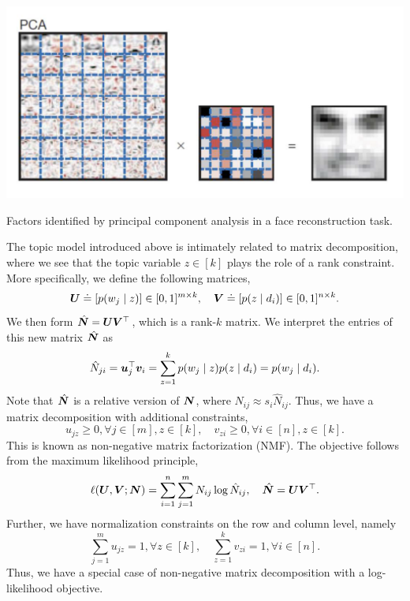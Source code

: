 \begin{marginfigure}
    \centering
    \includegraphics[width=\textwidth]{figures/pca_face}
    \caption{Factors identified by principal component analysis in a face reconstruction task.}
    \label{fig:pca}
\end{marginfigure}

The topic model introduced above is intimately related to matrix decomposition, where we see that
the topic variable $z \in [k]$ plays the role of a rank constraint. More specifically, we define
the following matrices, \[
    \bm{U} \doteq [p(w_j \mid z)] \in [0,1]^{m \times k}, \quad \bm{V} \doteq [p(z \mid d_i)] \in [0,1]^{n \times k}.
\]
We then form $\hat{\bm{N}} = \bm{U} \bm{V}^\top$, which is a rank-$k$ matrix. We
interpret the entries of this new matrix $\hat{\bm{N}}$ as \[
    \hat{N}_{ji} = \bm{u}_j^\top \bm{v}_i = \sum_{z=1}^{k} p(w_j \mid z) p(z \mid d_i) = p(w_j \mid d_i).
\]
Note that $\hat{\bm{N}}$ is a relative version of $\bm{N}$, where $N_{ij} \approx s_i
    \hat{N}_{ij}$. Thus, we have a matrix decomposition with additional constraints, \[
    u_{jz} \geq 0, \forall j \in [m], z \in [k], \quad v_{zi} \geq 0, \forall i \in [n], z \in [k].
\]
This is known as non-negative matrix factorization (NMF). The objective follows from the maximum
likelihood principle, \[
    \ell(\bm{U}, \bm{V}; \bm{N}) = \sum_{i=1}^{n} \sum_{j=1}^{m} N_{ij} \log \hat{N}_{ij}, \quad \hat{\bm{N}} = \bm{U} \bm{V}^\top.
\]
Further, we have normalization constraints on the row and column level, namely \[
    \sum_{j=1}^{m} u_{jz} = 1, \forall z \in [k], \quad \sum_{z=1}^{k} v_{zi} = 1, \forall i \in [n].
\]
Thus, we have a special case of non-negative matrix decomposition with a log-likelihood objective.

